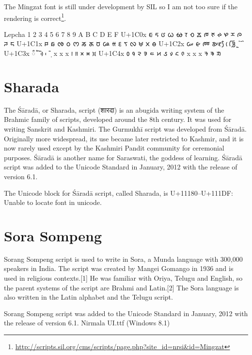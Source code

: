 The Mingzat font is still under development by SIL so I am not too sure if the rendering is correct\footnote{\url{http://scripts.sil.org/cms/scripts/page.php?site_id=nrsi&id=Mingzat}}.

\begin{scriptexample}[]{Lepcha}
\bgroup
\lepcha
{}	1	2	3	4	5	6	7	8	9	A	B	C	D	E	F
U+1C0x	 ᰀ	ᰁ	ᰂ	ᰃ	ᰄ	ᰅ	ᰆ	ᰇ	ᰈ	ᰉ	ᰊ	ᰋ	ᰌ	ᰍ	ᰎ	ᰏ
U+1C1x	 ᰐ	ᰑ	ᰒ	ᰓ	ᰔ	ᰕ	ᰖ	ᰗ	ᰘ	ᰙ	ᰚ	ᰛ	ᰜ	ᰝ	ᰞ	ᰟ
U+1C2x	 ᰠ	ᰡ	ᰢ	ᰣ	ᰤ	ᰥ	ᰦ	ᰧ	ᰨ	ᰩ	ᰪ	ᰫ	ᰬ	ᰭ	ᰮ	ᰯ
U+1C3x	 ᰰ	ᰱ	ᰲ	ᰳ	ᰴ	ᰵ	ᰶ	᰷	x	x	x	᰻	᰼	᰽	᰾	᰿
U+1C4x	 ᱀	᱁	᱂	᱃	᱄	᱅	᱆	᱇	᱈	᱉	x	x	x	ᱍ	ᱎ	ᱏ

\egroup
\end{scriptexample}

\section{Sharada}

The Śāradā, or Sharada, script (शारदा) is an abugida writing system of the Brahmic family of scripts, developed around the 8th century. It was used for writing Sanskrit and Kashmiri. The Gurmukhī script was developed from Śāradā. Originally more widespread, its use became later restricted to Kashmir, and it is now rarely used except by the Kashmiri Pandit community for ceremonial purposes. Śāradā is another name for Saraswati, the goddess of learning.
Śāradā script was added to the Unicode Standard in January, 2012 with the release of version 6.1.

The Unicode block for Śāradā script, called Sharada, is U+11180–U+111DF: Unable to locate font in unicode.


\section{Sora Sompeng}

Sorang Sompeng script is used to write in Sora, a Munda language with 300,000 speakers in India. The script was created by Mangei Gomango in 1936 and is used in religious contexts.[1] He was familiar with Oriya, Telugu and English, so the parent systems of the script are Brahmi and Latin.[2]
The Sora language is also written in the Latin alphabet and the Telugu script.

Sorang Sompeng script was added to the Unicode Standard in January, 2012 with the release of version 6.1. Nirmala UI.ttf (Windows 8.1)
\newfontfamily{}


 	
